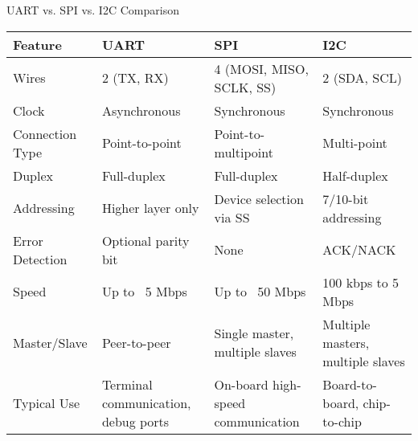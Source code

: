 \begin{concept}{UART vs. SPI vs. I2C Comparison}
\begin{center}
\begin{tabular}{|p{2.5cm}|p{4cm}|p{4cm}|p{4cm}|}
\hline
\textbf{Feature} & \textbf{UART} & \textbf{SPI} & \textbf{I2C} \\
\hline
Wires & 2 (TX, RX) & 4 (MOSI, MISO, SCLK, SS) & 2 (SDA, SCL) \\
\hline
Clock & Asynchronous & Synchronous & Synchronous \\
\hline
Connection Type & Point-to-point & Point-to-multipoint & Multi-point \\
\hline
Duplex & Full-duplex & Full-duplex & Half-duplex \\
\hline
Addressing & Higher layer only & Device selection via SS & 7/10-bit addressing \\
\hline
Error Detection & Optional parity bit & None & ACK/NACK \\
\hline
Speed & Up to ~5 Mbps & Up to ~50 Mbps & 100 kbps to 5 Mbps \\
\hline
Master/Slave & Peer-to-peer & Single master, multiple slaves & Multiple masters, multiple slaves \\
\hline
Typical Use & Terminal communication, debug ports & On-board high-speed communication & Board-to-board, chip-to-chip \\
\hline
\end{tabular}
\end{center}
\end{concept}